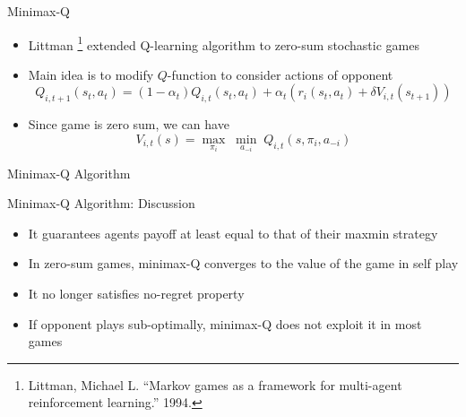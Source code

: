 \documentclass[11pt,aspectratio=169]{beamer}
\begin{document}
  
  \begin{frame}{Minimax-Q}
   \begin{itemize}[<+->]
   \setlength{\itemsep}{1.2em}
    \item Littman%
    \footnote{\scriptsize Littman, Michael L. ``Markov games as a framework for multi-agent reinforcement learning.'' 1994.}
    extended Q-learning algorithm to zero-sum stochastic games
    \item Main idea is to modify $Q$-function to consider actions of opponent
    $$Q_{i,t+1}(s_t, a_t) = (1 - \alpha_t)Q_{i,t}(s_t, a_t) + \alpha_t\left(r_i(s_t,a_t) + \delta V_{i,t}(s_{t+1})\right)$$
    \item Since game is zero sum, we can have
    $$V_{i,t}(s) = \underset{\pi_i}{\max} \; \underset{a_{-i}}{\min}\; Q_{i,t}(s,\pi_i,a_{-i})$$
   \end{itemize}
  \end{frame}
  
  
  \begin{frame}{Minimax-Q Algorithm}
   \begin{algorithm*}[H]
   \end{algorithm*}
  \end{frame}
  
  
  \begin{frame}{Minimax-Q Algorithm: Discussion}
   \begin{itemize}
   \setlength{\itemsep}{1.2em}
    \item It guarantees agents payoff at least equal to that of their maxmin strategy
    \item In zero-sum games, minimax-Q converges to the value of the game in self play
    \item It no longer satisfies no-regret property
    \item If opponent plays sub-optimally, minimax-Q does not exploit it in most games
   \end{itemize}
  \end{frame}
  
\end{document}
